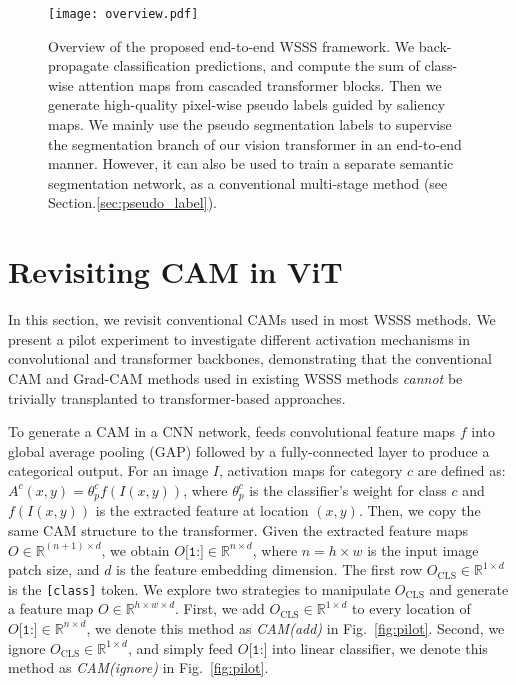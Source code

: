 \documentclass[10pt,twocolumn,letterpaper]{article}
\begin{document}
\begin{figure*}[!t]
   \begin{center}
   {\texttt{[image: overview.pdf]}} 
   \end{center}
\caption{
Overview of the proposed end-to-end WSSS framework.
We back-propagate classification predictions, and compute the sum of class-wise attention maps from cascaded transformer blocks. 
Then we generate high-quality pixel-wise pseudo labels guided by saliency maps. 
We mainly use the pseudo segmentation labels to supervise the segmentation branch of our vision transformer in an end-to-end manner.
However, it can also be used to train a separate semantic segmentation network, as a conventional multi-stage method (see Section.\ref{sec:pseudo_label}).
}
\label{fig:overview}
\end{figure*}


\section{Revisiting CAM in ViT}
\label{sections: pilot}
In this section, we revisit conventional CAMs \cite{ahn2018learning} used in most WSSS methods. 
We present a pilot experiment to investigate different activation mechanisms in convolutional and transformer backbones, demonstrating that the conventional CAM \cite{zhou2016learning} and Grad-CAM \cite{selvaraju2017grad} methods used in existing WSSS methods \textit{cannot} be trivially transplanted to transformer-based approaches.

To generate a CAM in a CNN network, \cite{zhou2016learning} feeds
convolutional feature maps $f$ into global average pooling (GAP) followed by a fully-connected layer to produce a categorical output.
For an image $I$, activation maps for category $c$ are defined as:
$A^c(x,y) = \theta^c_p f(I(x,y))$, 
where $\theta^c_p$ is the classifier's weight for class $c$ and  $f(I(x,y))$ is the extracted feature at location $(x,y)$.
Then, we copy the same CAM structure to the transformer. 
Given the extracted feature maps $O\in\mathbb{R}^{(n+1)\times d}$, we obtain $O\texttt{[1:]}\in\mathbb{R}^{n\times d}$, where $n = h\times w$ is the input image patch size, and $d$ is the feature embedding dimension. The first row $O_{\text{CLS}}\in\mathbb{R}^{1\times d}$ is the \texttt{[class]} token.
We explore two strategies to manipulate $O_{\text{CLS}}$ and generate a feature map $O\in\mathbb{R}^{h\times w\times d}$.
First, we add  $O_{\text{CLS}}\in\mathbb{R}^{1\times d}$ to every location of  $O\texttt{[1:]}\in\mathbb{R}^{n\times d}$, we denote this method as \textit{CAM(add)} in Fig.~\ref{fig:pilot}.
Second, we ignore  $O_{\text{CLS}}\in\mathbb{R}^{1\times d}$, and simply feed $O\texttt{[1:]}$ into linear classifier, we denote this method as \textit{CAM(ignore)} in Fig.~\ref{fig:pilot}.
\end{document}
